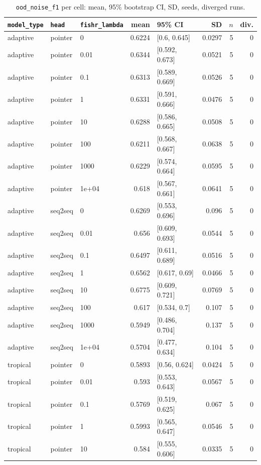\documentclass[10pt]{article}
\begin{document}
{\small
\begin{longtable}{lllrlrrr}
\caption{\texttt{ood\_noise\_f1} per cell: mean, 95\% bootstrap CI, SD, seeds, diverged runs.}\label{tab:summary-ood_noise_f1}\\
\toprule
\texttt{model\_type} & \texttt{head} & \texttt{fishr\_lambda} & mean & 95\% CI & SD & $n$ & div.\\
\midrule
\endhead
adaptive & pointer & 0 & 0.6224 & [0.6, 0.645] & 0.0297 & 5 & 0\\
adaptive & pointer & 0.01 & 0.6344 & [0.592, 0.673] & 0.0521 & 5 & 0\\
adaptive & pointer & 0.1 & 0.6313 & [0.589, 0.669] & 0.0526 & 5 & 0\\
adaptive & pointer & 1 & 0.6331 & [0.591, 0.666] & 0.0476 & 5 & 0\\
adaptive & pointer & 10 & 0.6288 & [0.586, 0.665] & 0.0508 & 5 & 0\\
adaptive & pointer & 100 & 0.6211 & [0.568, 0.667] & 0.0638 & 5 & 0\\
adaptive & pointer & 1000 & 0.6229 & [0.574, 0.664] & 0.0595 & 5 & 0\\
adaptive & pointer & 1e+04 & 0.618 & [0.567, 0.661] & 0.0641 & 5 & 0\\
adaptive & seq2seq & 0 & 0.6269 & [0.553, 0.696] & 0.096 & 5 & 0\\
adaptive & seq2seq & 0.01 & 0.656 & [0.609, 0.693] & 0.0544 & 5 & 0\\
adaptive & seq2seq & 0.1 & 0.6497 & [0.611, 0.689] & 0.0516 & 5 & 0\\
adaptive & seq2seq & 1 & 0.6562 & [0.617, 0.69] & 0.0466 & 5 & 0\\
adaptive & seq2seq & 10 & 0.6775 & [0.609, 0.721] & 0.0769 & 5 & 0\\
adaptive & seq2seq & 100 & 0.617 & [0.534, 0.7] & 0.107 & 5 & 0\\
adaptive & seq2seq & 1000 & 0.5949 & [0.486, 0.704] & 0.137 & 5 & 0\\
adaptive & seq2seq & 1e+04 & 0.5704 & [0.477, 0.634] & 0.104 & 5 & 0\\
tropical & pointer & 0 & 0.5893 & [0.56, 0.624] & 0.0424 & 5 & 0\\
tropical & pointer & 0.01 & 0.593 & [0.553, 0.643] & 0.0567 & 5 & 0\\
tropical & pointer & 0.1 & 0.5769 & [0.519, 0.625] & 0.067 & 5 & 0\\
tropical & pointer & 1 & 0.5993 & [0.565, 0.647] & 0.0546 & 5 & 0\\
tropical & pointer & 10 & 0.584 & [0.555, 0.606] & 0.0335 & 5 & 0\\

\end{longtable}}
\end{document}

